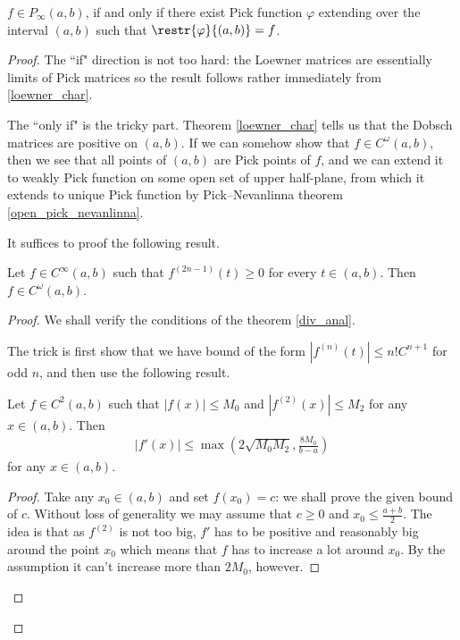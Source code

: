 \begin{lause}\label{loewners_theorem}
	$f \in P_{\infty}(a, b)$, if and only if there exist Pick function $\varphi$ extending over the interval $(a, b)$ such that $\restr{\varphi}{(a, b)} = f$.
\end{lause}

\begin{proof}
	The ``if" direction is not too hard: the Loewner matrices are essentially limits of Pick matrices so the result follows rather immediately from \ref{loewner_char}.

	The ``only if" is the tricky part. Theorem \ref{loewner_char} tells us that the Dobsch matrices are positive on $(a, b)$. If we can somehow show that $f \in C^{\omega}(a, b)$, then we see that all points of $(a, b)$ are Pick points of $f$, and we can extend it to weakly Pick function on some open set of upper half-plane, from which it extends to unique Pick function by Pick--Nevanlinna theorem \ref{open_pick_nevanlinna}.

	It suffices to proof the following result.

	\begin{lem}
		Let $f \in C^{\infty}(a, b)$ such that $f^{(2 n - 1)}(t) \geq 0$ for every $t \in (a, b)$. Then $f \in C^{\omega}(a, b)$.
	\end{lem}
	\begin{proof}
		We shall verify the conditions of the theorem \ref{div_anal}.

		The trick is first show that we have bound of the form $|f^{(n)}(t)| \leq n! C^{n + 1}$ for odd $n$, and then use the following result.
		\begin{lem}
			Let $f \in C^{2}(a, b)$ such that $|f(x)| \leq M_{0}$ and $|f^{(2)}(x)| \leq M_{2}$ for any $x \in (a, b)$. Then
			\begin{align*}
			|f'(x)| \leq \max\left(2\sqrt{M_{0} M_{2}}, \frac{8 M_{0}}{b - a}\right)
			\end{align*}
			for any $x \in (a, b)$.
		\end{lem}
		\begin{proof}
			Take any $x_{0} \in (a, b)$ and set $f(x_{0}) = c$: we shall prove the given bound of $c$. Without loss of generality we may assume that $c \geq 0$ and $x_{0} \leq \frac{a + b}{2}$. The idea is that as $f^{(2)}$ is not too big, $f'$ has to be positive and reasonably big around the point $x_{0}$ which means that $f$ has to increase a lot around $x_{0}$. By the assumption it can't increase more than $2 M_{0}$, however.


\end{proof}
\end{proof}
\end{proof}
